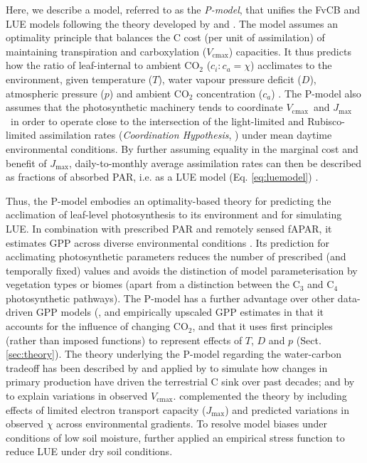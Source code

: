 \documentclass[gmd, manuscript]{copernicus}
\newcommand{\vcmax}{$V_{\text{cmax}}$}
\newcommand{\jmax}{$J_{\text{max}}$}
\begin{document}
Here, we describe a model, referred to as the \textit{P-model}, that unifies the FvCB and LUE models following the theory developed by \citet{prentice14ecollett} and \citet{wang17natpl}. The model assumes an optimality principle that balances the C cost (per unit of assimilation) of maintaining transpiration and carboxylation (\vcmax ) capacities. It thus predicts how the ratio of leaf-internal to ambient CO$_2$ ($c_i:c_a = \chi$) acclimates to the environment, given temperature ($T$), water vapour pressure deficit ($D$), atmospheric pressure ($p$) and ambient CO$_2$ concentration ($c_a$)  \citep{prentice14ecollett}. The P-model also assumes that the photosynthetic machinery tends to coordinate \vcmax\ and \jmax\ in order to operate close to the intersection of the light-limited and Rubisco-limited assimilation rates (\textit{Coordination Hypothesis}, \citet{chen93, maire12po}) under mean daytime environmental conditions. %
By further assuming equality in the marginal cost and benefit of \jmax , daily-to-monthly average assimilation rates can then be described as fractions of absorbed PAR, i.e. as a LUE model (Eq. \ref{eq:luemodel}) \citep{wang17natpl}.  

Thus, the P-model embodies an optimality-based theory for predicting the acclimation of leaf-level photosynthesis to its environment and for simulating LUE. In combination with prescribed PAR and remotely sensed fAPAR, it estimates GPP across diverse environmental conditions \citep{wang17natpl}. Its prediction for acclimating photosynthetic parameters reduces the number of prescribed (and temporally fixed) values and avoids the distinction of model parameterisation by vegetation types or biomes (apart from a distinction between the C$_3$ and C$_4$ photosynthetic pathways). The P-model has a further advantage over other data-driven GPP models (\citep{running04, Zhang2017-yr}, and empirically upscaled GPP estimates \citep{jung11jgr} in that it accounts for the influence of changing CO$_2$, and that it uses first principles (rather than imposed functions) to represent effects of $T$, $D$ and $p$ (Sect. \ref{sec:theory}). The theory underlying the P-model regarding the water-carbon tradeoff has been described by \citet{prentice14ecollett} and applied by \citet{keenan17natcomm} to simulate how changes in primary production have driven the terrestrial C sink over past decades; and by \citet{smith19ecollett} to explain variations in observed \vcmax . \citet{wang17natpl} complemented the theory by including effects of limited electron transport capacity (\jmax ) and predicted variations in observed $\chi$ across environmental gradients. To resolve model biases under conditions of low soil moisture, \citep{stocker19natgeo} further applied an empirical stress function to reduce LUE under dry soil conditions.
\end{document}
